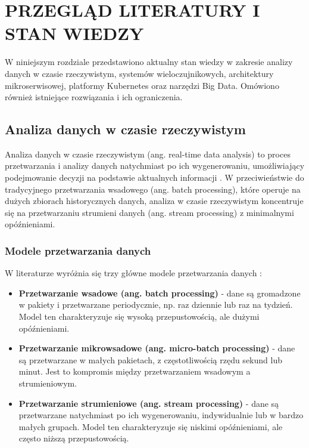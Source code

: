 \section{PRZEGLĄD LITERATURY I STAN WIEDZY}
\label{sec:przeglad_literatury}

W niniejszym rozdziale przedstawiono aktualny stan wiedzy w zakresie analizy danych w czasie rzeczywistym, systemów wieloczujnikowych, architektury mikroserwisowej, platformy Kubernetes oraz narzędzi Big Data. Omówiono również istniejące rozwiązania i ich ograniczenia.

\subsection{Analiza danych w czasie rzeczywistym}
\label{subsec:analiza_danych}

Analiza danych w czasie rzeczywistym (ang. real-time data analysis) to proces przetwarzania i analizy danych natychmiast po ich wygenerowaniu, umożliwiający podejmowanie decyzji na podstawie aktualnych informacji \citep{realtime_analytics}. W przeciwieństwie do tradycyjnego przetwarzania wsadowego (ang. batch processing), które operuje na dużych zbiorach historycznych danych, analiza w czasie rzeczywistym koncentruje się na przetwarzaniu strumieni danych (ang. stream processing) z minimalnymi opóźnieniami.

\subsubsection{Modele przetwarzania danych}
\label{subsubsec:modele_przetwarzania}

W literaturze wyróżnia się trzy główne modele przetwarzania danych \citep{data_processing_models}:

\begin{itemize}
    \item \textbf{Przetwarzanie wsadowe (ang. batch processing)} - dane są gromadzone w pakiety i przetwarzane periodycznie, np. raz dziennie lub raz na tydzień. Model ten charakteryzuje się wysoką przepustowością, ale dużymi opóźnieniami.
    \item \textbf{Przetwarzanie mikrowsadowe (ang. micro-batch processing)} - dane są przetwarzane w małych pakietach, z częstotliwością rzędu sekund lub minut. Jest to kompromis między przetwarzaniem wsadowym a strumieniowym.
    \item \textbf{Przetwarzanie strumieniowe (ang. stream processing)} - dane są przetwarzane natychmiast po ich wygenerowaniu, indywidualnie lub w bardzo małych grupach. Model ten charakteryzuje się niskimi opóźnieniami, ale często niższą przepustowością.
\end{itemize}

